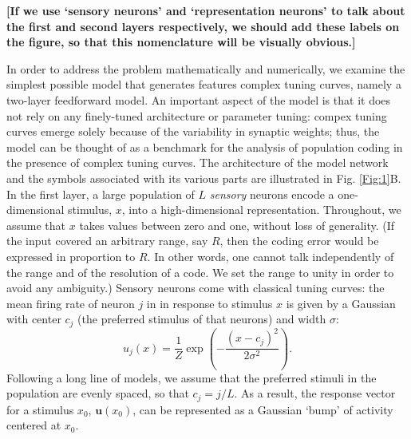 \documentclass[a4paper]{article}%
\begin{document}
\textbf{[If we use `sensory neurons' and `representation neurons' to talk
about the first and second layers respectively, we should add these labels on
the figure, so that this nomenclature will be visually obvious.]}

In order to address the problem mathematically and numerically, we examine the
simplest possible model that generates features complex tuning curves, namely
a two-layer feedforward model. An important aspect of the model is that it
does not rely on any finely-tuned architecture or parameter tuning: compex
tuning curves emerge solely because of the variability in synaptic weights;
thus, the model can be thought of as a benchmark for the analysis of
population coding in the presence of complex tuning curves. The architecture
of the model network and the symbols associated with its various parts are
illustrated in Fig. \ref{Fig:1}B. In the first layer, a large population of
$L$ \textit{sensory} neurons encode a one-dimensional stimulus, $x$, into a
high-dimensional representation. Throughout, we assume that $x$ takes values
between zero and one, without loss of generality. (If the input covered an
arbitrary range, say $R$, then the coding error would be expressed in
proportion to $R$. In other words, one cannot talk independently of the range
and of the resolution of a code. We set the range to unity in order to avoid
any ambiguity.) Sensory neurons come with classical tuning curves: the mean
firing rate of neuron $j$ in in response to stimulus $x$ is given by a
Gaussian with center $c_{j}$ (the preferred stimulus of that neurons) and
width $\sigma$:
\begin{equation}
u_{j}\left(  x\right)  =\frac{1}{Z}\exp\left(  -\frac{\left(  x-c_{j}\right)
^{2}}{2\sigma^{2}}\right)  .\label{tuning-curve-layer1}%
\end{equation}
Following a long line of models, we assume that the preferred stimuli in the
population are evenly spaced, so that $c_{j}=j/L$. As a result, the response
vector for a stimulus $x_{0}$, $\mathbf{u}\left(  x_{0}\right)  $, can be
represented as a Gaussian `bump' of activity centered at $x_{0}$.
\end{document}
